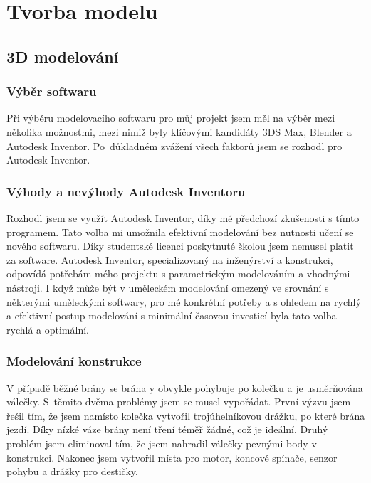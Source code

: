 \documentclass[12pt, a4paper, twoside]{report}
\begin{document}
	
	\chapter{Tvorba modelu}
	
	\section{3D modelování}
	
	\subsection{Výběr softwaru}
	
	\noindent Při výběru modelovacího softwaru pro můj projekt jsem měl na výběr mezi několika možnostmi, mezi nimiž byly klíčovými kandidáty 3DS Max, Blender a Autodesk Inventor. Po~důkladném zvážení všech faktorů jsem se rozhodl pro Autodesk Inventor. \\
	
	\subsection{Výhody a nevýhody Autodesk Inventoru}
	
	\noindent Rozhodl jsem se využít Autodesk Inventor, díky mé předchozí zkušenosti s tímto programem. Tato volba mi umožnila efektivní modelování bez nutnosti učení se nového softwaru. Díky studentské licenci poskytnuté školou jsem nemusel platit za software. Autodesk Inventor, specializovaný na inženýrství a konstrukci, odpovídá potřebám mého projektu s parametrickým modelováním a vhodnými nástroji. I když může být v uměleckém modelování omezený ve srovnání s některými uměleckými softwary, pro mé konkrétní potřeby a s ohledem na rychlý a efektivní postup modelování s minimální časovou investicí byla tato volba rychlá a optimální. \\
	
	\newpage
		
	\subsection{Modelování konstrukce}
	
	\noindent V případě běžné brány se brána	y obvykle pohybuje po kolečku a je usměrňována válečky. S~těmito dvěma problémy jsem se musel vypořádat. První výzvu jsem řešil tím, že jsem namísto kolečka vytvořil trojúhelníkovou drážku, po které brána jezdí. Díky nízké váze brány není tření téměř žádné, což je ideální. Druhý problém jsem eliminoval tím, že jsem nahradil válečky pevnými body v konstrukci. Nakonec jsem vytvořil místa pro motor, koncové spínače, senzor pohybu a drážky pro destičky. \\
	
\end{document}
